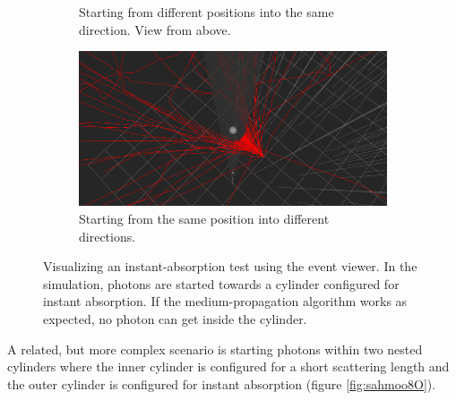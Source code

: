 \begin{figure}[htbp]
  \begin{subfigure}{.5\linewidth}
    \caption{Starting from different positions into the same direction. View from above.}
  \end{subfigure}
  \begin{subfigure}{.5\linewidth}
    \includegraphics[width=\textwidth, trim={0 0 40mm 0}, clip]{img/instant-absorption-steamshovel-Zae4phei}
    \caption{Starting from the same position into different directions.}
  \end{subfigure}
  \caption{Visualizing an instant-absorption test using the  event viewer. In the simulation, photons are started towards a cylinder configured for instant absorption. If the medium-propagation algorithm works as expected, no photon can get inside the cylinder.}
  \label{fig:moo9Eiqu}
\end{figure}

A related, but more complex scenario is starting photons within two nested cylinders where the inner cylinder is configured for a short scattering length and the outer cylinder is configured for instant absorption (figure \ref{fig:sahmoo8O}).


